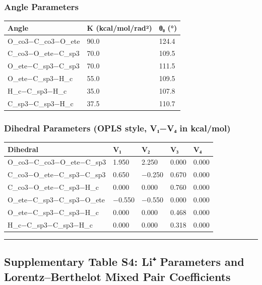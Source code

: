 \documentclass[
  11pt,
]{article}
\newcounter{none} %
\begin{document}
\subsubsection{Angle Parameters}\label{angle-parameters}

{\def\LTcaptype{none} %
\begin{longtable}[]{@{}lll@{}}
\toprule\noalign{}
Angle & K (kcal/mol/rad²) & θ₀ (°) \\
\midrule\noalign{}
\endhead
\bottomrule\noalign{}
\endlastfoot
O\_co3−C\_co3−O\_ete & 90.0 & 124.4 \\
C\_co3−O\_ete−C\_sp3 & 70.0 & 109.5 \\
O\_ete−C\_sp3−C\_sp3 & 70.0 & 111.5 \\
O\_ete−C\_sp3−H\_c & 55.0 & 109.5 \\
H\_c−C\_sp3−H\_c & 35.0 & 107.8 \\
C\_sp3−C\_sp3−H\_c & 37.5 & 110.7 \\
\end{longtable}
}

\subsubsection{Dihedral Parameters (OPLS style, V₁−V₄ in
kcal/mol)}\label{dihedral-parameters-opls-style-vux2081vux2084-in-kcalmol}

{\def\LTcaptype{none} %
\begin{longtable}[]{@{}lllll@{}}
\toprule\noalign{}
Dihedral & V₁ & V₂ & V₃ & V₄ \\
\midrule\noalign{}
\endhead
\bottomrule\noalign{}
\endlastfoot
O\_co3−C\_co3−O\_ete−C\_sp3 & 1.950 & 2.250 & 0.000 & 0.000 \\
C\_co3−O\_ete−C\_sp3−C\_sp3 & 0.650 & −0.250 & 0.670 & 0.000 \\
C\_co3−O\_ete−C\_sp3−H\_c & 0.000 & 0.000 & 0.760 & 0.000 \\
O\_ete−C\_sp3−C\_sp3−O\_ete & −0.550 & −0.550 & 0.000 & 0.000 \\
O\_ete−C\_sp3−C\_sp3−H\_c & 0.000 & 0.000 & 0.468 & 0.000 \\
H\_c−C\_sp3−C\_sp3−H\_c & 0.000 & 0.000 & 0.318 & 0.000 \\
\end{longtable}
}

\begin{center}\rule{0.5\linewidth}{0.5pt}\end{center}

\subsection{Supplementary Table S4: Li⁺ Parameters and
Lorentz--Berthelot Mixed Pair
Coefficients}\label{supplementary-table-s4-li-parameters-and-lorentzberthelot-mixed-pair-coefficients}
\end{document}
